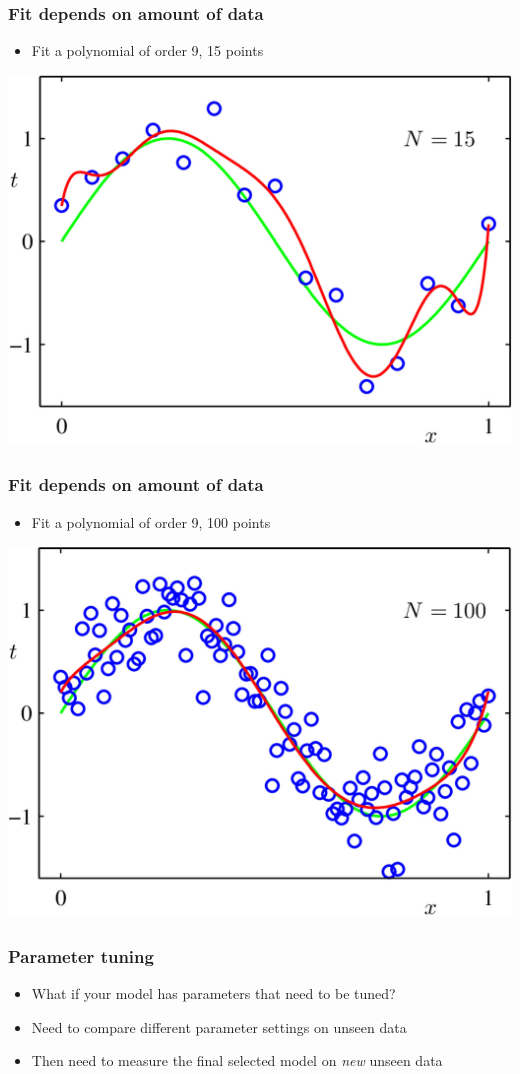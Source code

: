 \documentclass[12pt,notes,mathserif]{beamer}
\begin{document}
\begin{frame}[c]
	\frametitle{Fit depends on amount of data}
	\begin{itemize}
		\item  Fit a polynomial of order 9, 15 points
	\end{itemize}
	\begin{center}
		\includegraphics[width=0.61\linewidth]{fig/lec511.jpg}
	\end{center}
\end{frame}

\begin{frame}[c]
	\frametitle{Fit depends on amount of data}
	\begin{itemize}
		\item  Fit a polynomial of order 9, 100 points
	\end{itemize}
	\begin{center}
		\includegraphics[width=0.61\linewidth]{fig/lec512.jpg}
	\end{center}
\end{frame}

\begin{frame}[c]
	\frametitle{Parameter tuning}
	\begin{itemize}
		\item  What if your model has parameters that need to be tuned?
		\item  Need to compare different parameter settings on unseen data
		\item  Then need to measure the final selected model on \textit{new} unseen data
	\end{itemize}
\end{frame}
\end{document}
